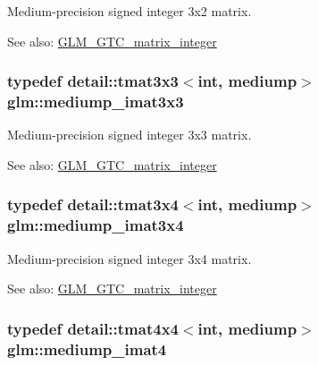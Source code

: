 Medium-precision signed integer 3x2 matrix. \begin{Desc}
\item[See also:]\hyperlink{group__gtc__matrix__integer}{GLM\_\-GTC\_\-matrix\_\-integer} \end{Desc}
\hypertarget{group__gtc__matrix__integer_gc5ee8dc182055bb0a00a90c031d4a714}{
\subsubsection[mediump\_\-imat3x3]{\setlength{\rightskip}{0pt plus 5cm}typedef detail::tmat3x3$<$int, mediump$>$ {\bf glm::mediump\_\-imat3x3}}}
\label{group__gtc__matrix__integer_gc5ee8dc182055bb0a00a90c031d4a714}


Medium-precision signed integer 3x3 matrix. \begin{Desc}
\item[See also:]\hyperlink{group__gtc__matrix__integer}{GLM\_\-GTC\_\-matrix\_\-integer} \end{Desc}
\hypertarget{group__gtc__matrix__integer_gaac79be4db34dde570c3331ffe728d55}{
\subsubsection[mediump\_\-imat3x4]{\setlength{\rightskip}{0pt plus 5cm}typedef detail::tmat3x4$<$int, mediump$>$ {\bf glm::mediump\_\-imat3x4}}}
\label{group__gtc__matrix__integer_gaac79be4db34dde570c3331ffe728d55}


Medium-precision signed integer 3x4 matrix. \begin{Desc}
\item[See also:]\hyperlink{group__gtc__matrix__integer}{GLM\_\-GTC\_\-matrix\_\-integer} \end{Desc}
\hypertarget{group__gtc__matrix__integer_gbf1a0fd4c85a21f67535b737e1feb355}{
\subsubsection[mediump\_\-imat4]{\setlength{\rightskip}{0pt plus 5cm}typedef detail::tmat4x4$<$int, mediump$>$ {\bf glm::mediump\_\-imat4}}}
\label{group__gtc__matrix__integer_gbf1a0fd4c85a21f67535b737e1feb355}


